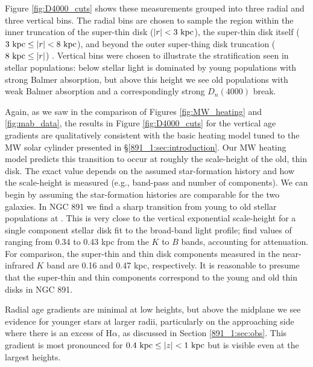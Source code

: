 Figure \ref{fig:D4000_cuts} shows these measurements grouped into
three radial and three vertical bins. The radial bins are chosen to
sample the region within the inner truncation of the super-thin disk
($|r| < 3~\mathrm{kpc} $), the super-thin disk itself ($3~\mathrm{kpc} \leq
|r| < 8~\mathrm{kpc} $), and beyond the outer super-thing disk truncation
($8~\mathrm{kpc}  \leq |r|$) \citep{Schechtman-Rook13}. Vertical bins
were chosen to illustrate the stratification seen in stellar
populations: below  stellar light is dominated by young
populations with strong Balmer absorption, but above this height we
see old populations with weak Balmer absorption and a correspondingly
strong $D_n(4000)$ break.

Again, as we saw in the comparison of Figures \ref{fig:MW_heating} and
\ref{fig:mab_data}, the results in Figure \ref{fig:D4000_cuts} for
the vertical age gradients are qualitatively consistent with the basic
heating model tuned to the MW solar cylinder presented in
\S\ref{891_1:sec:introduction}. Our MW heating model predicts this
transition to occur at roughly the scale-height of the old, thin
disk. The exact value depends on the assumed star-formation history
and how the scale-height is measured (e.g., band-pass and number of
components). We can begin by assuming the star-formation histories are
comparable for the two galaxies. In NGC 891 we find a sharp transition
from young to old stellar populations at . This is very
close to the vertical exponential scale-height for a single component
stellar disk fit to the broad-band light profile; \citet{Xilouris99}
find values of ranging from 0.34 to 0.43 kpc from the $K$ to $B$
bands, accounting for attenuation. For comparison, the super-thin and
thin disk components measured in the near-infrared $K$ band are 0.16
and 0.47 kpc, respectively. It is reasonable to presume that the
super-thin and thin components correspond to the young and old thin
disks in NGC 891.

Radial age gradients are minimal at low heights, but above the
midplane we see evidence for younger stars at larger radii,
particularly on the approaching side where there is an excess of
H$\alpha$, as discussed in Section \ref{891_1:sec:obs}. This gradient is
most pronounced for $0.4~\mathrm{kpc}  \leq |z| < 1~\mathrm{kpc} $ but is
visible even at the largest heights.

